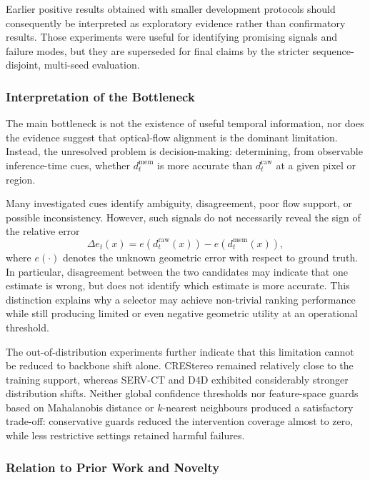 \documentclass[11pt,a4paper]{article}
\begin{document}
Earlier positive results obtained with smaller development protocols should consequently be interpreted as exploratory evidence rather than confirmatory results. Those experiments were useful for identifying promising signals and failure modes, but they are superseded for final claims by the stricter sequence-disjoint, multi-seed evaluation.

\subsubsection{Interpretation of the Bottleneck}

The main bottleneck is not the existence of useful temporal information, nor does the evidence suggest that optical-flow alignment is the dominant limitation. Instead, the unresolved problem is decision-making: determining, from observable inference-time cues, whether \(d_t^{\mathrm{mem}}\) is more accurate than \(d_t^{\mathrm{raw}}\) at a given pixel or region.

Many investigated cues identify ambiguity, disagreement, poor flow support, or possible inconsistency. However, such signals do not necessarily reveal the sign of the relative error
\[
\Delta e_t(x)
=
e\!\left(d_t^{\mathrm{raw}}(x)\right)
-
e\!\left(d_t^{\mathrm{mem}}(x)\right),
\]
where \(e(\cdot)\) denotes the unknown geometric error with respect to ground truth. In particular, disagreement between the two candidates may indicate that one estimate is wrong, but does not identify which estimate is more accurate. This distinction explains why a selector may achieve non-trivial ranking performance while still producing limited or even negative geometric utility at an operational threshold.

The out-of-distribution experiments further indicate that this limitation cannot be reduced to backbone shift alone. CREStereo remained relatively close to the training support, whereas SERV-CT and D4D exhibited considerably stronger distribution shifts. Neither global confidence thresholds nor feature-space guards based on Mahalanobis distance or \(k\)-nearest neighbours produced a satisfactory trade-off: conservative guards reduced the intervention coverage almost to zero, while less restrictive settings retained harmful failures.

\subsubsection{Relation to Prior Work and Novelty}
\end{document}
